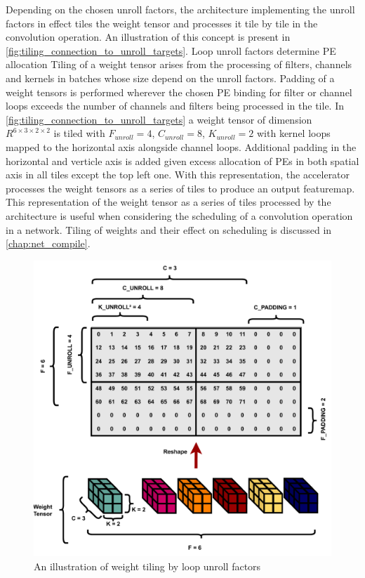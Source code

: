 Depending on the chosen unroll factors, the architecture implementing the unroll
factors in effect tiles the weight tensor and processes it tile by tile in the
convolution operation. An
illustration of this concept is present in
\autoref{fig:tiling_connection_to_unroll_targets}. Loop unroll factors determine
PE allocation 
Tiling of a weight tensor arises from the processing of filters, channels and
kernels in batches whose size depend on the unroll factors. 
Padding of a weight tensors is performed wherever the chosen PE
binding for filter or channel loops exceeds the number of channels and filters
being processed in the tile. In
\autoref{fig:tiling_connection_to_unroll_targets} a weight tensor of dimension
$R^{6\times 3\times 2\times 2}$ is tiled with $F_{unroll} = 4$, $C_{unroll}=8$,
$K_{unroll}=2$ with kernel loops mapped to the horizontal axis alongside channel
loops. Additional padding in the horizontal and verticle axis is added given
excess allocation of PEs in both spatial axis in all tiles except the top left
one. With this representation, the accelerator processes the weight tensors as a
series of tiles to produce an output featuremap.    
This representation of the weight tensor as a series of tiles processed by
the architecture is useful when considering the scheduling of a convolution
operation in a network. Tiling of weights and their effect on scheduling is
discussed in \autoref{chap:net_compile}.

\begin{figure}[]
    \centering
    \includegraphics[scale=0.5]{fig/tiling.pdf}
    \caption{An illustration of weight tiling by loop unroll factors}
    \label{fig:tiling_connection_to_unroll_targets}
\end{figure}

